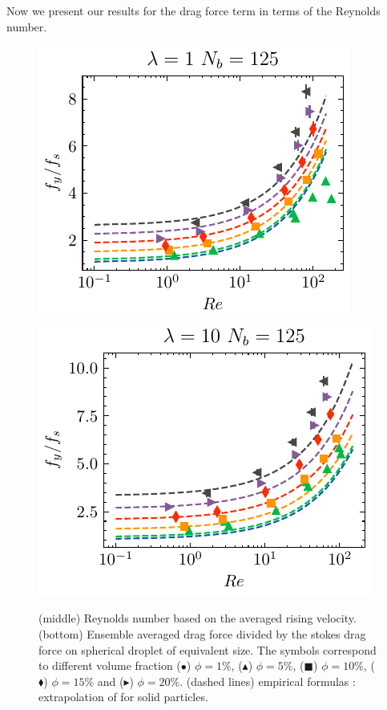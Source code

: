




Now we present our results for the drag force term in terms of the Reynolds number. 
\begin{figure}[h!]
    \centering
    \includegraphics[height = 0.35\textwidth]{image/HOMOGENEOUS/fCA/Fstokes_N_5_l_1.pdf}
    \includegraphics[height = 0.35\textwidth]{image/HOMOGENEOUS/fCA/Fstokes_N_5_l_10.pdf}
    \caption{
        (middle) Reynolds number based on the averaged rising velocity.
    (bottom) Ensemble averaged drag force divided by the stokes drag force on spherical droplet of equivalent size.
    The symbols correspond to different volume fraction ($\bullet$) $\phi = 1\%$, ($\blacktriangle$) $\phi = 5\%$, ($\blacksquare$) $\phi = 10\%$, ($\blacklozenge$) $\phi = 15\%$ and ($\blacktriangleright$) $\phi = 20\%$.
    (dashed lines) empirical formulas : extrapolation of  \citet{tenneti2011drag} for solid particles. }
    \label{fig:drag_force}
\end{figure}

